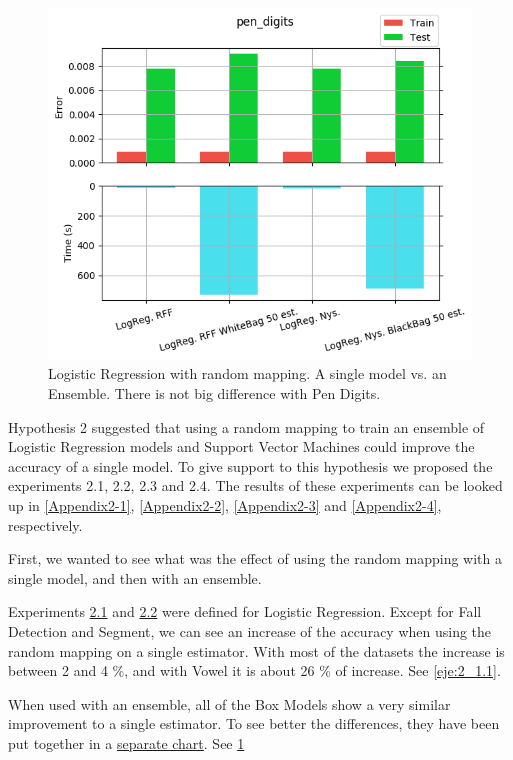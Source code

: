 \begin{pre-delivery}
\begin{figure}[th]
\centering
\includegraphics[scale=0.6]{Figures/2_2/aux/pen_digits}
\decoRule
\caption{Logistic Regression with random mapping. A single model vs. an Ensemble. There is not big difference with Pen Digits.}
\label{eje:2_1.2}
\end{figure}

Hypothesis 2 suggested that using a random mapping to train an ensemble of
Logistic Regression models and Support Vector Machines could improve the
accuracy of a single model. To give support to this hypothesis we proposed
the experiments 2.1, 2.2, 2.3 and 2.4. The results of these experiments
can be looked up in
\ref{Appendix2-1},
\ref{Appendix2-2},
\ref{Appendix2-3} and
\ref{Appendix2-4}, respectively.

First, we wanted to see what was the effect of using the random mapping with
a single model, and then with an ensemble.

Experiments \hyperref[Appendix2-1]{2.1} and \hyperref[Appendix2-3]{2.2} were
defined for Logistic Regression.
Except for Fall Detection and Segment, we can see an increase of the accuracy
when using the random mapping on a single estimator. With most of the datasets
the increase is between 2 and 4 \%, and with Vowel it is about 26 \% of
increase. See \ref{eje:2_1.1}.

When used with an ensemble, all of the Box Models show a very similar
improvement to a single estimator.
To see better the differences, they have been put together in a
\hyperref[2_2:aux]{separate chart}. See \ref{eje:2_1.2}


\end{pre-delivery}
